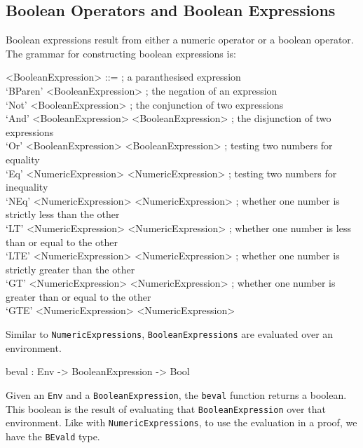     \subsection{Boolean Operators and Boolean Expressions}
        Boolean expressions result from either a numeric operator or a boolean operator. The grammar for constructing boolean expressions is:
        \setlength{\grammarindent}{11em}
        \begin{grammar}
            <BooleanExpression>
            ::=  ; a paranthesised expression\\
            `BParen' <BooleanExpression>
            \alt ; the negation of an expression\\
            `Not' <BooleanExpression>
            \alt ; the conjunction of two expressions\\
            `And' <BooleanExpression> <BooleanExpression>
            \alt ; the disjunction of two expressions\\
            `Or' <BooleanExpression> <BooleanExpression>
            \alt ; testing two numbers for equality\\
            `Eq' <NumericExpression> <NumericExpression>
            \alt ; testing two numbers for inequality\\
            `NEq' <NumericExpression> <NumericExpression>
            \alt ; whether one number is strictly less than the other\\
            `LT' <NumericExpression> <NumericExpression>
            \alt ; whether one number is less than or equal to the other\\
            `LTE' <NumericExpression> <NumericExpression>
            \alt ; whether one number is strictly greater than the other\\
            `GT' <NumericExpression> <NumericExpression>
            \alt ; whether one number is greater than or equal to the other\\
            `GTE' <NumericExpression> <NumericExpression>
        \end{grammar}
        Similar to \texttt{NumericExpressions}, \texttt{BooleanExpressions} are evaluated over an environment.
        \begin{code}[caption={The type of the \texttt{beval} function}]
            beval : Env -> BooleanExpression -> Bool
        \end{code}
        Given an \texttt{Env} and a \texttt{BooleanExpression}, the \texttt{beval} function returns a boolean. This boolean is the result of evaluating that \texttt{BooleanExpression} over that environment. Like with \texttt{NumericExpressions}, to use the evaluation in a proof, we have the \texttt{BEvald} type.
